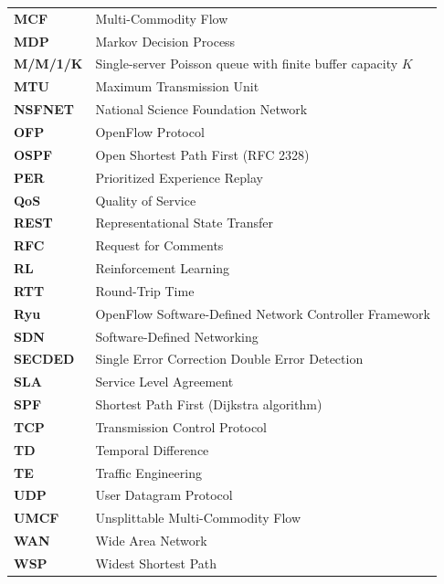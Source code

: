 \documentclass[12pt,a4paper,oneside]{report}
\begin{document}
\begin{table}[htbp]
\begin{tabularx}{\textwidth}{l X}
\textbf{MCF} & Multi-Commodity Flow \\
\textbf{MDP} & Markov Decision Process \\
\textbf{M/M/1/K} & Single-server Poisson queue with finite buffer capacity $K$ \\
\textbf{MTU} & Maximum Transmission Unit \\
\textbf{NSFNET} & National Science Foundation Network \\
\textbf{OFP} & OpenFlow Protocol \\
\textbf{OSPF} & Open Shortest Path First (RFC 2328) \\
\textbf{PER} & Prioritized Experience Replay \\
\textbf{QoS} & Quality of Service \\
\textbf{REST} & Representational State Transfer \\
\textbf{RFC} & Request for Comments \\
\textbf{RL} & Reinforcement Learning \\
\textbf{RTT} & Round-Trip Time \\
\textbf{Ryu} & OpenFlow Software-Defined Network Controller Framework \\
\textbf{SDN} & Software-Defined Networking \\
\textbf{SECDED} & Single Error Correction Double Error Detection \\
\textbf{SLA} & Service Level Agreement \\
\textbf{SPF} & Shortest Path First (Dijkstra algorithm) \\
\textbf{TCP} & Transmission Control Protocol \\
\textbf{TD} & Temporal Difference \\
\textbf{TE} & Traffic Engineering \\
\textbf{UDP} & User Datagram Protocol \\
\textbf{UMCF} & Unsplittable Multi-Commodity Flow \\
\textbf{WAN} & Wide Area Network \\
\textbf{WSP} & Widest Shortest Path \\
\bottomrule
\end{tabularx}
\end{table}

\clearpage
{}

\end{document}

